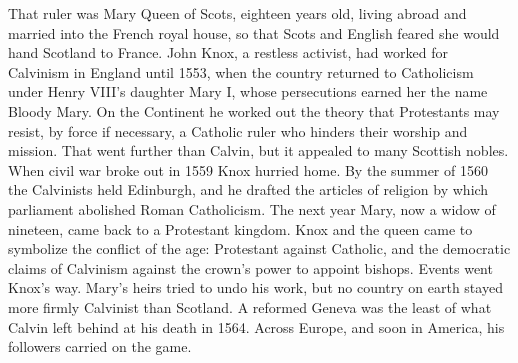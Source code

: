 That ruler was Mary Queen of Scots, eighteen years old, living abroad and married into the French
royal house, so that Scots and English feared she would hand Scotland to France. John Knox, a restless
activist, had worked for Calvinism in England until 1553, when the country returned to Catholicism
under Henry VIII's daughter Mary I, whose persecutions earned her the name Bloody Mary. On the
Continent he worked out the theory that Protestants may resist, by force if necessary, a Catholic
ruler who hinders their worship and mission. That went further than Calvin, but it appealed to many
Scottish nobles. When civil war broke out in 1559 Knox hurried home. By the summer of 1560 the
Calvinists held Edinburgh, and he drafted the articles of religion by which parliament abolished Roman
Catholicism. The next year Mary, now a widow of nineteen, came back to a Protestant kingdom. Knox and
the queen came to symbolize the conflict of the age: Protestant against Catholic, and the democratic
claims of Calvinism against the crown's power to appoint bishops. Events went Knox's way. Mary's heirs tried to undo his work, but no country on earth stayed more firmly Calvinist than Scotland. A reformed Geneva was the least of what Calvin left behind at his death in 1564. Across Europe, and
soon in America, his followers carried on the game.

\begin{keyfacts}
\end{keyfacts}
